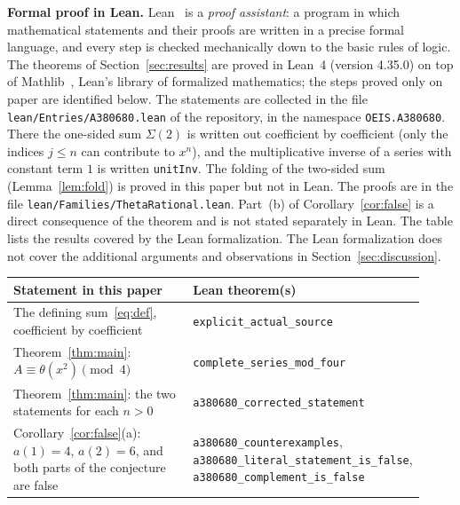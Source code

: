 \documentclass[11pt,a4paper]{article}
\theoremstyle{definition}
\theoremstyle{remark}
\newcommand{\para}[1]{\par\medskip\noindent\textbf{#1}\enspace}
\begin{document}
\para{Formal proof in Lean.}
Lean~\cite{lean} is a \emph{proof assistant}: a program in which mathematical statements and their proofs are written
in a precise formal language, and every step is checked mechanically down to the basic rules of logic. The theorems of Section~\ref{sec:results} are proved in Lean~4 (version 4.35.0) on top of
Mathlib~\cite{mathlib}, Lean's library of formalized mathematics; the steps proved only on paper are identified below. The statements are collected in the file \texttt{lean/Entries/A380680.lean} of the repository,
in the namespace \texttt{OEIS.A380680}. There the one-sided sum $\Sigma(2)$ is written out coefficient by coefficient (only the indices $j\le n$ can contribute to $x^n$), and the multiplicative inverse of a series with constant term $1$ is written \texttt{unitInv}. The folding of the two-sided sum (Lemma~\ref{lem:fold}) is proved in this paper but not in Lean. The proofs are in the file \texttt{lean/Families/ThetaRational.lean}. Part~(b) of Corollary~\ref{cor:false} is a direct consequence of the theorem and is not stated separately in Lean.
The table lists the results covered by the Lean formalization. The Lean formalization does not cover the additional arguments and observations in Section~\ref{sec:discussion}.
\begin{center}\small\renewcommand{\arraystretch}{1.25}
\begin{tabular}{>{\raggedright\arraybackslash}p{0.52\linewidth}>{\raggedright\arraybackslash}p{0.4\linewidth}}
\toprule
Statement in this paper & Lean theorem(s)\\
\midrule
The defining sum~\eqref{eq:def}, coefficient by coefficient & \texttt{explicit\_\allowbreak{}actual\_\allowbreak{}source} \\
Theorem~\ref{thm:main}: $A\equiv\theta(x^2)\pmod4$ & \texttt{complete\_\allowbreak{}series\_\allowbreak{}mod\_\allowbreak{}four} \\
Theorem~\ref{thm:main}: the two statements for each $n>0$ & \texttt{a380680\_\allowbreak{}corrected\_\allowbreak{}statement} \\
Corollary~\ref{cor:false}(a): $a(1)=4$, $a(2)=6$, and both parts of the conjecture are false & \texttt{a380680\_\allowbreak{}counterexamples}, \texttt{a380680\_\allowbreak{}literal\_\allowbreak{}statement\_\allowbreak{}is\_\allowbreak{}false}, \texttt{a380680\_\allowbreak{}complement\_\allowbreak{}is\_\allowbreak{}false} \\
\bottomrule
\end{tabular}
\end{center}
\end{document}
